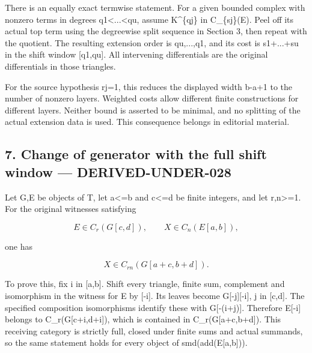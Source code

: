 There is an equally exact termwise statement. For a given bounded complex with nonzero terms in degrees q1<...<qu,\allowbreak{} assume K\^{}\{qj\} in C\_\allowbreak{}\{sj\}(E)\allowbreak{}. Peel off its actual top term using the degreewise split sequence in Section 3,\allowbreak{} then repeat with the quotient. The resulting extension order is qu,\allowbreak{}...,\allowbreak{}q1,\allowbreak{} and its cost is s1\allowbreak{}+...\allowbreak{}+su in the shift window [q1,\allowbreak{}qu]\allowbreak{}. All intervening differentials are the original differentials in those triangles.

For the source hypothesis rj\allowbreak{}=1,\allowbreak{} this reduces the displayed width b-a\allowbreak{}+1 to the number of nonzero layers. Weighted costs allow different finite constructions for different layers. Neither bound is asserted to be minimal,\allowbreak{} and no splitting of the actual extension data is used. This consequence belongs in editorial material.

\subsection{7. Change of generator with the full shift window --- DERIVED-UNDER-028}\label{proofs-10691-11108-change-of-generator-with-the-full-shift-window-derived-under-028}

Let G,\allowbreak{}E be objects of T,\allowbreak{} let a<\allowbreak{}=b and c<\allowbreak{}=d be finite integers,\allowbreak{} and let r,\allowbreak{}n>\allowbreak{}=1. For the original witnesses satisfying

\[
 E\in C_r(G[c,d]),\qquad X\in C_n(E[a,b]),
\]

one has

\[
 X\in C_{rn}(G[a+c,b+d]).
\]

To prove this,\allowbreak{} fix i in [a,\allowbreak{}b]\allowbreak{}. Shift every triangle,\allowbreak{} finite sum,\allowbreak{} complement and isomorphism in the witness for E by [-i]\allowbreak{}. Its leaves become G[-j]\allowbreak{}[-i]\allowbreak{},\allowbreak{} j in [c,\allowbreak{}d]\allowbreak{}. The specified composition isomorphisms identify these with G[-(i\allowbreak{}+j)\allowbreak{}]\allowbreak{}. Therefore E[-i]\allowbreak{} belongs to C\_\allowbreak{}r(G[c\allowbreak{}+i,\allowbreak{}d\allowbreak{}+i]\allowbreak{})\allowbreak{},\allowbreak{} which is contained in C\_\allowbreak{}r(G[a\allowbreak{}+c,\allowbreak{}b\allowbreak{}+d]\allowbreak{})\allowbreak{}. This receiving category is strictly full,\allowbreak{} closed under finite sums and actual summands,\allowbreak{} so the same statement holds for every object of smd(add(E[a,\allowbreak{}b]\allowbreak{})\allowbreak{})\allowbreak{}.


